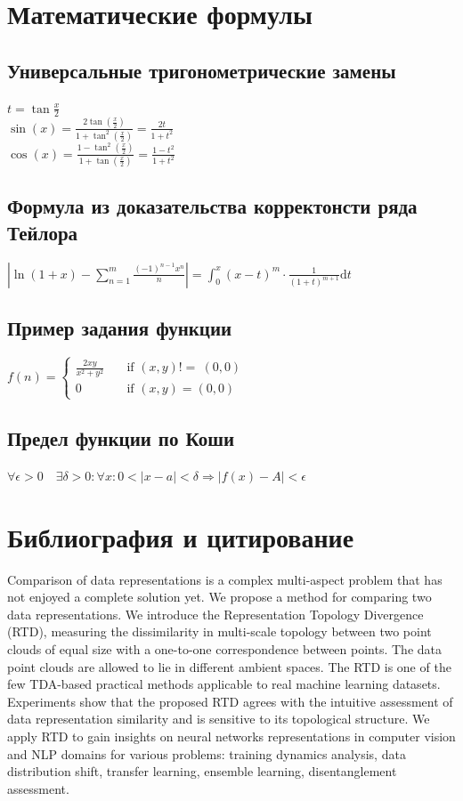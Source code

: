 \documentclass[10pt,a4paper]{report}
\begin{document}
\chapter{Математические формулы}
\section{Универсальные тригонометрические замены}
$t = \tan\frac{x}{2}$\\
$\sin(x) = \frac{2\tan(\frac{x}{2})}{1 + \tan^2(\frac{x}{2})} = \frac{2t}{1 + t^2}$\\
$\cos(x) = \frac{1 - \tan^2(\frac{x}{2})}{1 + \tan(\frac{x}{2})} = \frac{1 - t^2}{1 + t^2}$

\section{Формула из доказательства корректонсти ряда Тейлора}
$|\ln{(1 + x)} - \sum_{n=1}^{m}\frac{(-1)^{n-1}x^n}{n}| = \int_{0}^{x} (x-t)^m \cdot \frac{1}{(1+t)^{m+1}} \mathrm{d}t$

\section{Пример задания функции}
$ f(n) =
  \begin{cases}
    \frac{2xy}{x^2 + y^2}       & \quad \text{if } (x, y) \mathrel{\mathtt{!=}}\ (0, 0)\\
    0  & \quad \text{if } (x, y) = (0, 0)
  \end{cases}
$
\section{Предел функции по Коши}
$\forall \epsilon > 0 \quad \exists \delta>0: \forall x: {0 < |x-a| < \delta} \Rightarrow {|f(x) - A|< \epsilon}$
\clearpage

\chapter{Библиография и цитирование}


Comparison of data representations is a complex multi-aspect problem that has not enjoyed a complete solution yet. We propose a method for comparing two data representations. We introduce the Representation Topology Divergence (RTD), measuring the dissimilarity in multi-scale topology between two point clouds of equal size with a one-to-one correspondence between points. The data point clouds are allowed to lie in different ambient spaces. The RTD is one of the few TDA-based practical methods applicable to real machine learning datasets. Experiments show that the proposed RTD agrees with the intuitive assessment of data representation similarity and is sensitive to its topological structure. We apply RTD to gain insights on neural networks representations in computer vision and NLP domains for various problems: training dynamics analysis, data distribution shift, transfer learning, ensemble learning, disentanglement assessment.\cite{barannikov2021representation}
\end{document}
